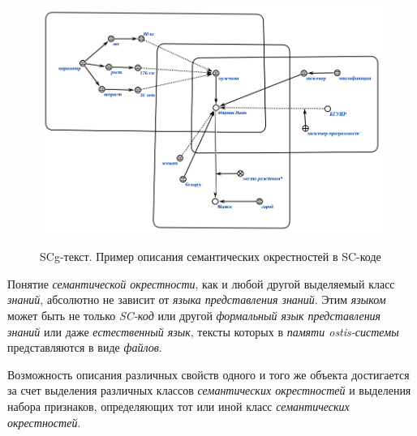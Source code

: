 \begin{figure}[H]
	\caption{SCg-текст. Пример описания семантических окрестностей в SC-коде}
	\includegraphics[scale=0.7]{author/part2/figures/chapter_kb/semantic_neighborhood.png}
	\label{fig:semantic_neighborhood}
\end{figure}

Понятие \textit{семантической окрестности}, как и любой другой  выделяемый класс \textit{знаний}, абсолютно не зависит от \textit{языка представления знаний}. Этим \textit{языком} может быть не только \textit{SC-код} или другой \textit{формальный язык представления знаний} или даже \textit{естественный язык}, тексты которых в \textit{памяти ostis-системы} представляются в виде \textit{файлов}.

Возможность описания различных свойств одного и того же объекта достигается за счет выделения различных классов \textit{семантических окрестностей} и выделения набора признаков, определяющих тот или иной класс \textit{семантических окрестностей}.

